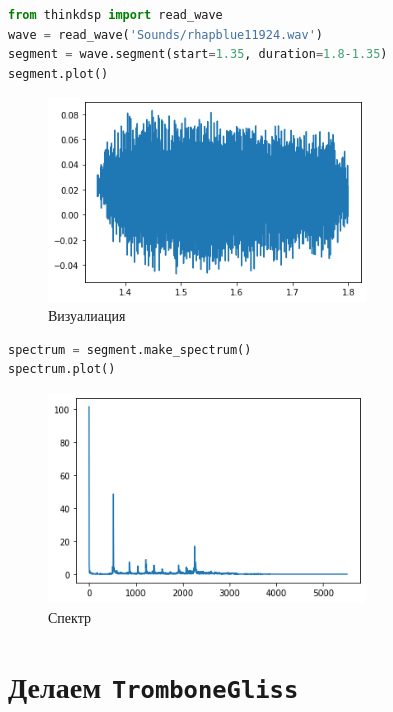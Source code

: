 \documentclass[a4paper,12pt]{report}
\begin{document}
\begin{lstlisting}[language=Python,caption=Загрузка]
from thinkdsp import read_wave
wave = read_wave('Sounds/rhapblue11924.wav')
segment = wave.segment(start=1.35, duration=1.8-1.35)
segment.plot()
\end{lstlisting}

    \begin{figure}[H]
        \centering
        \includegraphics[width=0.75\textwidth]{ex4_wave.png}
        \caption{Визуалиация}
        \label{fig:ex4_wave}
    \end{figure}
    
\begin{lstlisting}[language=Python,caption=Спектр]
spectrum = segment.make_spectrum()
spectrum.plot()
\end{lstlisting}

    \begin{figure}[H]
        \centering
        \includegraphics[width=0.75\textwidth]{ex4_spectrum.png}
        \caption{Спектр}
        \label{fig:ex4_spectrum}
    \end{figure}
    
    \chapter{Делаем \texttt{TromboneGliss}}
    
\end{document}
